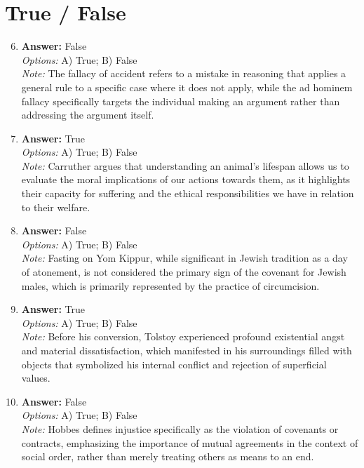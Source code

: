 \documentclass[12pt]{article}
\begin{document}
\section*{True / False}
\begin{enumerate}[label=\arabic*.]
\setcounter{enumi}{5}
\item \textbf{Answer:} False
\\ \textit{Options:} A) True; B) False
\\ \textit{Note:} The fallacy of accident refers to a mistake in reasoning that applies a general rule to a specific case where it does not apply, while the ad hominem fallacy specifically targets the individual making an argument rather than addressing the argument itself.
\item \textbf{Answer:} True
\\ \textit{Options:} A) True; B) False
\\ \textit{Note:} Carruther argues that understanding an animal's lifespan allows us to evaluate the moral implications of our actions towards them, as it highlights their capacity for suffering and the ethical responsibilities we have in relation to their welfare.
\item \textbf{Answer:} False
\\ \textit{Options:} A) True; B) False
\\ \textit{Note:} Fasting on Yom Kippur, while significant in Jewish tradition as a day of atonement, is not considered the primary sign of the covenant for Jewish males, which is primarily represented by the practice of circumcision.
\item \textbf{Answer:} True
\\ \textit{Options:} A) True; B) False
\\ \textit{Note:} Before his conversion, Tolstoy experienced profound existential angst and material dissatisfaction, which manifested in his surroundings filled with objects that symbolized his internal conflict and rejection of superficial values.
\item \textbf{Answer:} False
\\ \textit{Options:} A) True; B) False
\\ \textit{Note:} Hobbes defines injustice specifically as the violation of covenants or contracts, emphasizing the importance of mutual agreements in the context of social order, rather than merely treating others as means to an end.
\end{enumerate}
\end{document}
